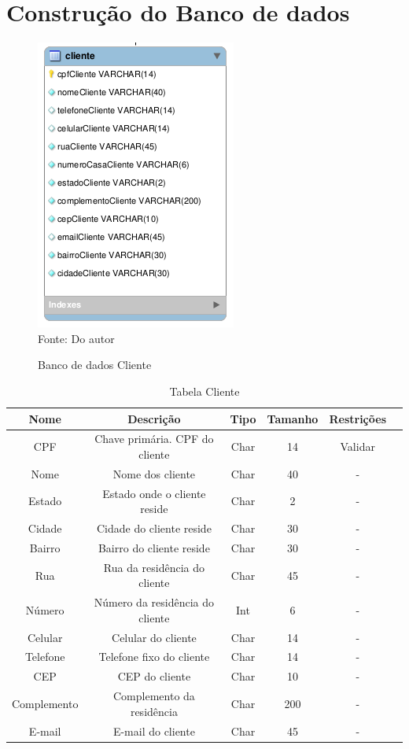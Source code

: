 \section{Construção do Banco de dados}


\begin{figure}[H]
	\centering 
	\caption{Banco de dados Cliente}
	\label{banco_de_dados}
	\includegraphics[scale = 0.8]{imagens/bd-cliente.png}
	\\Fonte: Do autor
\end{figure}

\begin{table}[H]
\caption{Tabela Cliente}
\begin{center}
\begin{tabular}{|c|c|c|c|c|c|}
\hline
Nome & Descrição & Tipo & Tamanho & Restrições \\ \hline
CPF & Chave primária. CPF do cliente & Char & 14 & Validar \\ \hline
Nome & Nome dos cliente & Char & 40 & - \\ \hline
Estado & Estado onde o cliente reside & Char & 2 & - \\ \hline
Cidade & Cidade do cliente reside& Char & 30 & - \\ \hline
Bairro & Bairro do cliente reside& Char & 30 & - \\ \hline
Rua & Rua da residência do cliente& Char & 45 & - \\ \hline
Número & Número da residência do cliente & Int & 6 & - \\ \hline
Celular & Celular do cliente & Char & 14 & - \\ \hline
Telefone & Telefone fixo do cliente & Char & 14 & - \\ \hline
CEP & CEP do cliente & Char & 10 & - \\ \hline
Complemento & Complemento da residência& Char & 200 & - \\ \hline
E-mail & E-mail do cliente & Char & 45 & - \\ \hline
\end{tabular}
\end{center}
\label{tabela_cliente}
\end{table}

